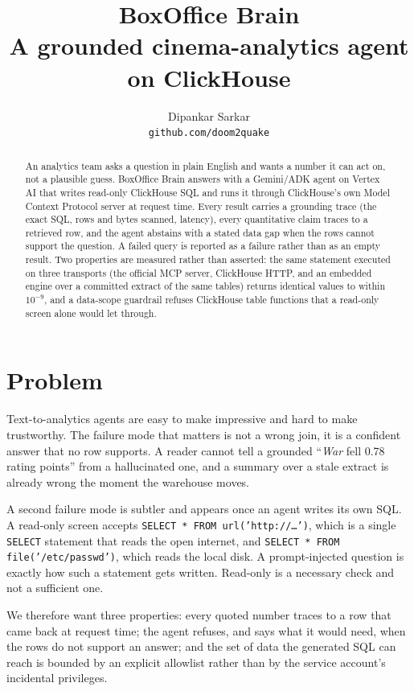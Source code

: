 \documentclass[10pt,twocolumn]{article}
\title{\vspace{-2em}\textbf{BoxOffice Brain}\\[2pt]
\large A grounded cinema-analytics agent on ClickHouse}
\author{Dipankar Sarkar\\ \small \texttt{github.com/doom2quake}}
\date{}
\begin{document}
\maketitle

\begin{abstract}
An analytics team asks a question in plain English and wants a number it can act
on, not a plausible guess. BoxOffice Brain answers with a Gemini/ADK agent on
Vertex AI that writes read-only ClickHouse SQL and runs it through ClickHouse's
own Model Context Protocol server at request time. Every result carries a grounding trace (the exact SQL,
rows and bytes scanned, latency), every quantitative claim traces to a retrieved
row, and the agent abstains with a stated data gap when the rows cannot support
the question. A failed query is reported as a failure rather than as an empty
result. Two properties are measured rather than asserted: the same statement
executed on three transports (the official MCP server, ClickHouse HTTP, and an
embedded engine over a committed extract of the same tables) returns identical
values to within $10^{-9}$, and a data-scope guardrail refuses ClickHouse table
functions that a read-only screen alone would let through.
\end{abstract}

\section{Problem}
Text-to-analytics agents are easy to make impressive and hard to make
trustworthy. The failure mode that matters is not a wrong join, it is a
confident answer that no row supports. A reader cannot tell a grounded
``\emph{War} fell 0.78 rating points'' from a hallucinated one, and a summary
over a stale extract is already wrong the moment the warehouse moves.

A second failure mode is subtler and appears once an agent writes its own SQL.
A read-only screen accepts \texttt{SELECT * FROM url('http://\ldots')}, which is
a single \texttt{SELECT} statement that reads the open internet, and
\texttt{SELECT * FROM file('/etc/passwd')}, which reads the local disk. A
prompt-injected question is exactly how such a statement gets written. Read-only
is a necessary check and not a sufficient one.

We therefore want three properties: every quoted number traces to a row that
came back at request time; the agent refuses, and says what it would need, when
the rows do not support an answer; and the set of data the generated SQL can
reach is bounded by an explicit allowlist rather than by the service account's
incidental privileges.
\end{document}
